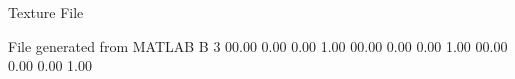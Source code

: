 Texture File

File generated from MATLAB
B 3
   00.00   0.00   0.00   1.00
   00.00   0.00   0.00   1.00
   00.00   0.00   0.00   1.00
